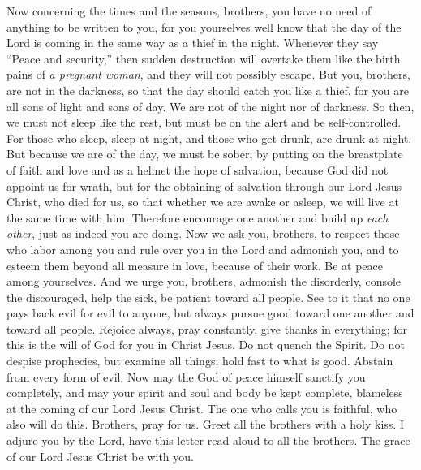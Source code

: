 \begin{biblechapter} %
 Now concerning the times and the seasons, brothers, you have no need of anything to be written to you,
\verse for you yourselves well know that the day of the Lord is coming in the same way as a thief in the night.
\verse Whenever they say “Peace and security,” then sudden destruction will overtake them like the birth pains of \textit{a pregnant woman}, and they will not possibly escape.
\verse But you, brothers, are not in the darkness, so that the day should catch you like a thief,
\verse for you are all sons of light and sons of day. We are not of the night nor of darkness.
\verse So then, we must not sleep like the rest, but must be on the alert and be self-controlled.
\verse For those who sleep, sleep at night, and those who get drunk, are drunk at night.
\verse But because we are of the day, we must be sober, by putting on the breastplate of faith and love and as a helmet the hope of salvation,
\verse because God did not appoint us for wrath, but for the obtaining of salvation through our Lord Jesus Christ,
\verse who died for us, so that whether we are awake or asleep, we will live at the same time with him.
\verse Therefore encourage one another and build up \textit{each other}, just as indeed you are doing.
 Now we ask you, brothers, to respect those who labor among you and rule over you in the Lord and admonish you,
\verse and to esteem them beyond all measure in love, because of their work. Be at peace among yourselves.
\verse And we urge you, brothers, admonish the disorderly, console the discouraged, help the sick, be patient toward all people.
\verse See to it that no one pays back evil for evil to anyone, but always pursue good toward one another and toward all people.
\verse Rejoice always,
\verse pray constantly,
\verse give thanks in everything; for this is the will of God for you in Christ Jesus.
\verse Do not quench the Spirit.
\verse Do not despise prophecies,
\verse but examine all things; hold fast to what is good.
\verse Abstain from every form of evil.
\verse Now may the God of peace himself sanctify you completely, and may your spirit and soul and body be kept complete, blameless at the coming of our Lord Jesus Christ.
\verse The one who calls you is faithful, who also will do this.
\verse Brothers, pray for us.
\verse Greet all the brothers with a holy kiss.
\verse I adjure you by the Lord, have this letter read aloud to all the brothers.
\verse The grace of our Lord Jesus Christ be with you.
\end{biblechapter}

